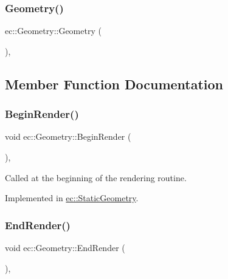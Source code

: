 \mbox{\label{classec_1_1_geometry_a409c80ac243a5eb27c2a98b17cc8b3e9}} 
\subsubsection{\texorpdfstring{Geometry()}{Geometry()}}
{\footnotesize\ttfamily ec\+::\+Geometry\+::\+Geometry (\begin{DoxyParamCaption}{ }\end{DoxyParamCaption})\hspace{0.3cm}{\ttfamily [explicit]}, {\ttfamily [protected]}}



\subsection{Member Function Documentation}
\mbox{\label{classec_1_1_geometry_a184b4fdde8062c1dc0eb9e3393cc540f}} 
\subsubsection{\texorpdfstring{Begin\+Render()}{BeginRender()}}
{\footnotesize\ttfamily void ec\+::\+Geometry\+::\+Begin\+Render (\begin{DoxyParamCaption}{ }\end{DoxyParamCaption})\hspace{0.3cm}{\ttfamily [protected]}, {}}

Called at the beginning of the rendering routine. 

Implemented in \mbox{\hyperlink{classec_1_1_static_geometry_a58dfe3cc7d91f3bcf99d83b038cf5f1d}{ec\+::\+Static\+Geometry}}.

\mbox{\label{classec_1_1_geometry_a41ed9550a0d1746c55add3c3c0a38984}} 
\subsubsection{\texorpdfstring{End\+Render()}{EndRender()}}
{\footnotesize\ttfamily void ec\+::\+Geometry\+::\+End\+Render (\begin{DoxyParamCaption}{ }\end{DoxyParamCaption})\hspace{0.3cm}{\ttfamily [protected]}, {}}

